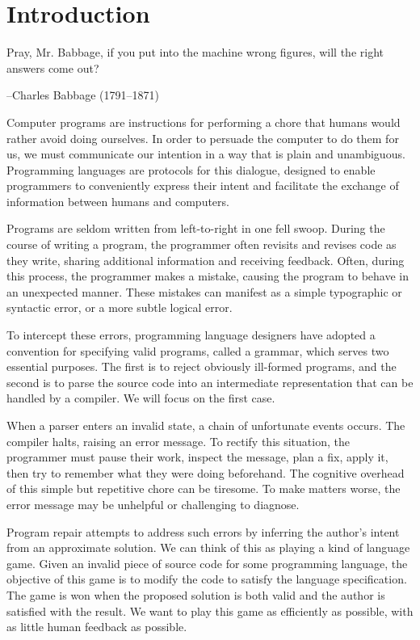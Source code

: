 \chapter{\rm\bfseries Introduction}
\label{ch:introduction}

\epigraph{Pray, Mr. Babbage, if you put into the machine wrong figures, will the right answers come out?}{--Charles Babbage (1791--1871)}


Computer programs are instructions for performing a chore that humans would rather avoid doing ourselves. In order to persuade the computer to do them for us, we must communicate our intention in a way that is plain and unambiguous. Programming languages are protocols for this dialogue, designed to enable programmers to conveniently express their intent and facilitate the exchange of information between humans and computers.

Programs are seldom written from left-to-right in one fell swoop. During the course of writing a program, the programmer often revisits and revises code as they write, sharing additional information and receiving feedback. Often, during this process, the programmer makes a mistake, causing the program to behave in an unexpected manner. These mistakes can manifest as a simple typographic or syntactic error, or a more subtle logical error.

To intercept these errors, programming language designers have adopted a convention for specifying valid programs, called a grammar, which serves two essential purposes. The first is to reject obviously ill-formed programs, and the second is to parse the source code into an intermediate representation that can be handled by a compiler. We will focus on the first case.

When a parser enters an invalid state, a chain of unfortunate events occurs. The compiler halts, raising an error message. To rectify this situation, the programmer must pause their work, inspect the message, plan a fix, apply it, then try to remember what they were doing beforehand. The cognitive overhead of this simple but repetitive chore can be tiresome. To make matters worse, the error message may be unhelpful or challenging to diagnose.

Program repair attempts to address such errors by inferring the author's intent from an approximate solution. We can think of this as playing a kind of language game. Given an invalid piece of source code for some programming language, the objective of this game is to modify the code to satisfy the language specification. The game is won when the proposed solution is both valid and the author is satisfied with the result. We want to play this game as efficiently as possible, with as little human feedback as possible.

